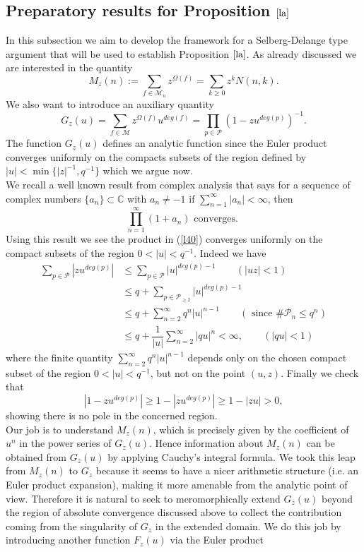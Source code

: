 \documentclass[12pt]{amsart}
\numberwithin{equation}{section}
\theoremstyle{remark}
\theoremstyle{remark}
\theoremstyle{definition}
\begin{document}
\subsection{Preparatory results for Proposition $\ref{la}$}
In this subsection we aim to develop the framework for a Selberg-Delange type argument that will be used to establish Proposition $\ref{la}$. As already discussed we are interested in the quantity
$$M_z(n):=\displaystyle\sum\limits_{f\in\mathcal{M}_n} z^{\Omega(f)}=\displaystyle\sum\limits_{k\geqslant 0}z^k N(n,k).$$
We also want to introduce an auxiliary quantity
\begin{equation}\label{l40}
G_z(u)=\displaystyle\sum\limits_{f\in\mathcal{M}} z^{\Omega(f)}u^{deg (f)}=\displaystyle\prod_{p\in\mathcal{P}}\left(1-zu^{deg(p)}\right)^{-1}.
\end{equation}
The function $G_z(u)$ defines an analytic function since the Euler product converges uniformly on the compacts subsets of the region defined by $|u|<\min \big\{ |z|^{-1},q^{-1}\big \}$ which we argue now.\\ 
We recall a well known result from complex analysis that says for a sequence of complex numbers $\{ a_n\}\subset \mathbb{C}$ with $a_n\neq -1$ if $\sum\limits_{n=1}^{\infty} |a_n|<\infty$, then $$\prod\limits_{n=1}^{\infty} (1+a_n) \text{ converges. }$$
Using this result we see the product in (\ref{l40}) converges uniformly on the compact subsets of the region $0<|u|<q^{-1}.$ Indeed we have
\begin{align}
\nonumber
\displaystyle\sum\limits_{p\in\mathcal{P}}\left|zu^{deg(p)}\right|  &\leqslant \displaystyle\sum\limits_{p\in\mathcal{P}}|u|^{deg(p)-1}  \qquad (|uz|<1)\\
\nonumber
&\leqslant q+ \displaystyle\sum\limits_{p\in\mathcal{P}_{\geqslant 2}}|u|^{deg(p)-1}\\
\nonumber
&\leqslant q+ \displaystyle\sum\limits_{n=2}^{\infty}q^n|u|^{n-1} \qquad \left(\text{ since } \#\mathcal{P}_n\leqslant q^n \right)\\
\nonumber
&\leqslant q+ \dfrac{1}{|u|}\displaystyle\sum\limits_{n=2}^{\infty} |qu|^n< \infty, \qquad (|qu|<1)
\end{align}
where the finite quantity $\sum\limits_{n=2}^{\infty} q^n|u|^{n-1}$ depends only on the chosen compact subset of the region $0<|u|<q^{-1}$, but not on the point $(u,z)$.
Finally we check that \[|1-zu^{deg(p)}|\geqslant 1-|zu^{deg(p)}|\geqslant 1-|zu|>0,\] showing there is no pole in the concerned region.\\
Our job is to understand $M_z(n)$, which is precisely given by the coefficient of $u^n$ in the power series of $G_z(u)$. Hence information about $M_z(n)$ can be obtained from $G_z(u)$ by applying Cauchy's integral formula. We took this leap from $M_z(n)$ to $G_z$ because it seems to have a nicer arithmetic structure (i.e. an Euler product expansion), making it more amenable from the analytic point of view. Therefore it is natural to seek to meromorphically extend $G_z(u)$ beyond the region of absolute convergence discussed above to collect the contribution coming from the singularity of $G_z$ in the extended domain. We do this job by introducing another function $F_z(u)$ via the Euler product
\end{document}

